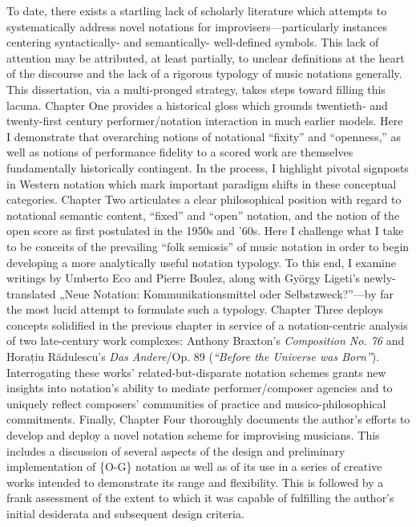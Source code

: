 {
To date, there exists a startling lack of scholarly literature which attempts to systematically address novel notations for improvisers---particularly instances centering syntactically- and semantically- well-defined symbols. This lack of attention may be attributed, at least partially, to unclear definitions at the heart of the discourse and the lack of a rigorous typology of music notations generally. This dissertation, via a multi-pronged strategy, takes steps toward filling this lacuna. Chapter One provides a historical gloss which grounds twentieth- and twenty-first century performer/notation interaction in much earlier models. Here I demonstrate that overarching notions of notational ``fixity'' and ``openness,'' as well as notions of performance fidelity to a scored work are themselves fundamentally historically contingent. In the process, I highlight pivotal signposts in Western notation which mark important paradigm shifts in these conceptual categories. Chapter Two articulates a clear philosophical position with regard to notational semantic content, ``fixed'' and ``open'' notation, and the notion of the open score as first postulated in the 1950s and '60s. Here I challenge what I take to be conceits of the prevailing ``folk semiosis'' of music notation in order to begin developing a more analytically useful notation typology. To this end, I examine writings by Umberto Eco and Pierre Boulez, along with Gy\"{o}rgy Ligeti's newly-translated „Neue Notation: Kommunikationsmittel oder Selbstzweck?”---by far the most lucid attempt to formulate such a typology. Chapter Three deploys concepts solidified in the previous chapter in service of a notation-centric analysis of two late-century work complexes: Anthony Braxton's \textit{Composition No. 76} and Horațiu Rădulescu's \textit{Das Andere}/Op. 89 (\textit{``Before the Universe was Born''}). Interrogating these works' related-but-disparate notation schemes grants new insights into notation's ability to mediate performer/composer agencies and to uniquely reflect composers' communities of practice and musico-philosophical commitments. Finally, Chapter Four thoroughly documents the author's efforts to develop and deploy a novel notation scheme for improvising musicians. This includes a discussion of several aspects of the design and preliminary implementation of \{O-G\} notation as well as of its use in a series of creative works intended to demonstrate its range and flexibility. This is followed by a frank assessment of the extent to which it was capable of fulfilling the author's initial desiderata and subsequent design criteria.
}


